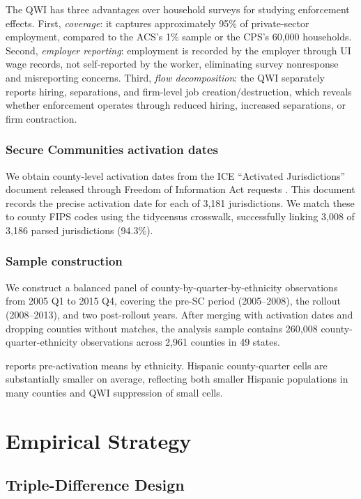 \documentclass[12pt]{article}
\begin{document}
The QWI has three advantages over household surveys for studying enforcement effects. First, \textit{coverage}: it captures approximately 95\% of private-sector employment, compared to the ACS's 1\% sample or the CPS's 60,000 households. Second, \textit{employer reporting}: employment is recorded by the employer through UI wage records, not self-reported by the worker, eliminating survey nonresponse and misreporting concerns. Third, \textit{flow decomposition}: the QWI separately reports hiring, separations, and firm-level job creation/destruction, which reveals whether enforcement operates through reduced hiring, increased separations, or firm contraction.

\subsubsection*{Secure Communities activation dates} We obtain county-level activation dates from the ICE ``Activated Jurisdictions'' document released through Freedom of Information Act requests \citep{ice2013activated}. This document records the precise activation date for each of 3,181 jurisdictions. We match these to county FIPS codes using the tidycensus crosswalk, successfully linking 3,008 of 3,186 parsed jurisdictions (94.3\%).

\subsubsection*{Sample construction} We construct a balanced panel of county-by-quarter-by-ethnicity observations from 2005 Q1 to 2015 Q4, covering the pre-SC period (2005--2008), the rollout (2008--2013), and two post-rollout years. After merging with activation dates and dropping counties without matches, the analysis sample contains 260,008 county-quarter-ethnicity observations across 2,961 counties in 49 states.



 reports pre-activation means by ethnicity. Hispanic county-quarter cells are substantially smaller on average, reflecting both smaller Hispanic populations in many counties and QWI suppression of small cells.


\section{Empirical Strategy}
\label{sec:strategy}

\subsection{Triple-Difference Design}
\end{document}
